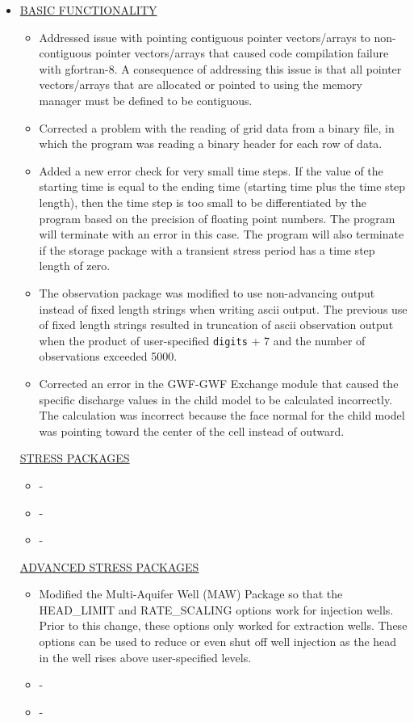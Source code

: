 \documentclass[11pt,twoside,twocolumn]{usgsreport}
\begin{document}
\begin{itemize}

\item \currentmodflowversion

\underline{BASIC FUNCTIONALITY}
\begin{itemize}
\item Addressed issue with pointing contiguous pointer vectors/arrays to non-contiguous pointer vectors/arrays that caused code compilation failure with gfortran-8. A consequence of addressing this issue is that all pointer vectors/arrays that are allocated or pointed to using the memory manager must be defined to be contiguous.
\item Corrected a problem with the reading of grid data from a binary file, in which the program was reading a binary header for each row of data.
\item Added a new error check for very small time steps.  If the value of the starting time is equal to the ending time (starting time plus the time step length), then the time step is too small to be differentiated by the program based on the precision of floating point numbers.  The program will terminate with an error in this case.  The program will also terminate if the storage package with a transient stress period has a time step length of zero.
\item The observation package was modified to use non-advancing output instead of fixed length strings when writing ascii output. The previous use of fixed length strings resulted in truncation of ascii observation output when the product of user-specified \texttt{digits} + 7 and the number of observations exceeded 5000.
\item Corrected an error in the GWF-GWF Exchange module that caused the specific discharge values in the child model to be calculated incorrectly.  The calculation was incorrect because the face normal for the child model was pointing toward the center of the cell instead of outward.
\end{itemize}

\underline{STRESS PACKAGES}
\begin{itemize}
\item -
\item -
\item - 
\end{itemize}

\underline{ADVANCED STRESS PACKAGES}
\begin{itemize}
\item Modified the Multi-Aquifer Well (MAW) Package so that the HEAD\_LIMIT and RATE\_SCALING options work for injection wells.  Prior to this change, these options only worked for extraction wells.  These options can be used to reduce or even shut off well injection as the head in the well rises above user-specified levels.
\item -
\item - 
\end{itemize}


\end{itemize}
\end{document}
